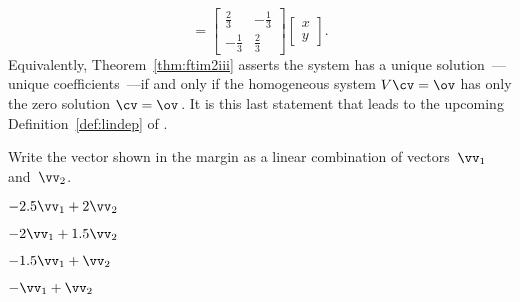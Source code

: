 \begin{example}
\begin{solution}
\begin{equation*}
=\begin{bmatrix} \frac23&-\frac13\\-\frac13&\frac23 \end{bmatrix}
\begin{bmatrix} x\\y \end{bmatrix}.
\end{equation*}
Equivalently, Theorem~\ref{thm:ftim2iii} asserts the system has a unique solution~\cv---unique coefficients~\cv---if and only if the {homogeneous} system \(V\cv=\ov\) has only the zero solution \(\cv=\ov\)\,.
It is this last statement that leads to the upcoming Definition~\ref{def:lindep} of .
\end{solution}
\end{example}



\begin{activity}
Write the vector shown in the margin as a linear combination of vectors~\(\vv_1\) and~\(\vv_2\).
\begin{parts}
\item \(-2.5\vv_1 +2\vv_2\)
\item \(-2\vv_1 +1.5\vv_2\)\actans
\item \(-1.5\vv_1 +\vv_2\)
\item \(-\vv_1 +\vv_2\)
\end{parts}
\end{activity}








